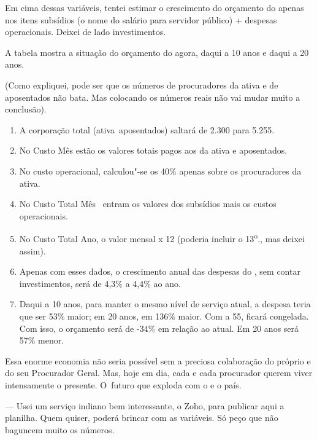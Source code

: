 Em cima dessas variáveis, tentei estimar o crescimento do orçamento do
 apenas nos itens subsídios (o nome do salário para servidor público)
+ despesas operacionais. Deixei de lado investimentos.


A tabela mostra a situação do orçamento do  agora, daqui a 10 anos e
daqui a 20 anos.

(Como expliquei, pode ser que os números de procuradores da ativa e de
aposentados não bata. Mas colocando os números reais não vai mudar muito
a conclusão).

\begin{enumerate}
\itemsep1pt\parskip0pt
\item
  A corporação total (ativa~aposentados) saltará de 2.300 para 5.255.
\item
  No Custo Mês estão os valores totais pagos aos da ativa e aposentados.
\item
  No custo operacional, calculou"-se os 40\% apenas sobre os procuradores
  da ativa.
\item
  No Custo Total Mês~ entram os valores dos subsídios
  mais os custos operacionais.
\item
  No Custo Total Ano, o valor mensal x 12 (poderia incluir o
  13\textsuperscript{o}., mas deixei assim).
\item
  Apenas com esses dados, o crescimento anual das despesas do , sem
  contar investimentos, será de 4,3\% a 4,4\% ao ano.
\item
  Daqui a 10 anos, para manter o mesmo nível de serviço atual, a despesa
  teria que ser 53\% maior; em 20 anos, em 136\% maior. Com a  55,
  ficará congelada. Com isso, o orçamento será de -34\% em relação ao
  atual. Em 20 anos será 57\% menor.
\end{enumerate}

Essa enorme economia não seria possível sem a preciosa colaboração do
próprio  e do seu Procurador Geral. Mas, hoje em dia, cada  e cada
procurador querem viver intensamente o presente. O~futuro que exploda
com o  e o país.

 --- Usei um serviço indiano bem interessante, o Zoho, para publicar
aqui a planilha. Quem quiser, poderá brincar com as variáveis. Só peço
que não baguncem muito os números.

 

 

 
